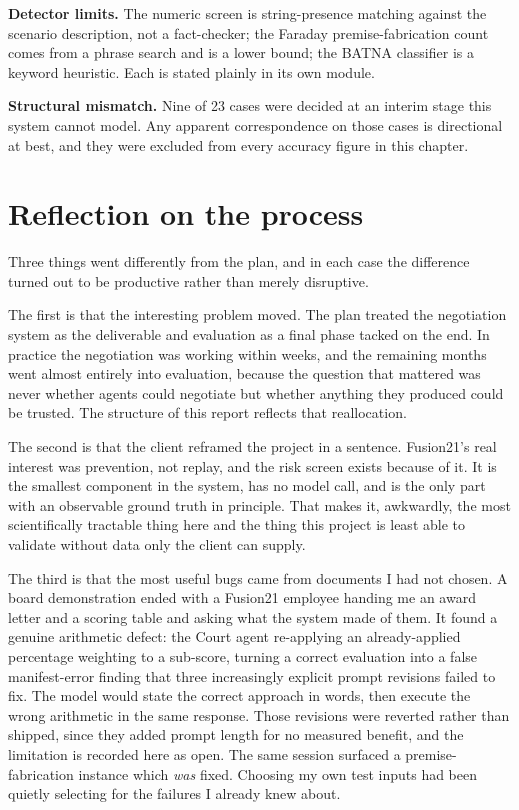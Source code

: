 \textbf{Detector limits.} The numeric screen is string-presence matching against
the scenario description, not a fact-checker; the Faraday premise-fabrication
count comes from a phrase search and is a lower bound; the BATNA classifier is a
keyword heuristic. Each is stated plainly in its own module.

\textbf{Structural mismatch.} Nine of 23 cases were decided at an interim stage
this system cannot model. Any apparent correspondence on those cases is
directional at best, and they were excluded from every accuracy figure in this
chapter.

\section{Reflection on the process}
\label{sec:reflection}

Three things went differently from the plan, and in each case the difference
turned out to be productive rather than merely disruptive.

The first is that the interesting problem moved. The plan treated the negotiation
system as the deliverable and evaluation as a final phase tacked on the end. In
practice the negotiation was working within weeks, and the remaining months went
almost entirely into evaluation, because the question that mattered was never
whether agents could negotiate but whether anything they produced could be
trusted. The structure of this report reflects that reallocation.

The second is that the client reframed the project in a sentence. Fusion21's real
interest was prevention, not replay, and the risk screen exists because of it. It
is the smallest component in the system, has no model call, and is the only part
with an observable ground truth in principle. That makes it, awkwardly, the most
scientifically tractable thing here and the thing this project is least able to
validate without data only the client can supply.

The third is that the most useful bugs came from documents I had not chosen. A
board demonstration ended with a Fusion21 employee handing me an award letter and
a scoring table and asking what the system made of them. It found a genuine
arithmetic defect: the Court agent re-applying an already-applied percentage
weighting to a sub-score, turning a correct evaluation into a false
manifest-error finding that three increasingly explicit prompt revisions failed
to fix. The model would state the correct approach in words, then execute the
wrong arithmetic in the same response. Those revisions were reverted rather than
shipped, since they added prompt length for no measured benefit, and the
limitation is recorded here as open. The same session surfaced a
premise-fabrication instance which \emph{was} fixed. Choosing my own test inputs
had been quietly selecting for the failures I already knew about.